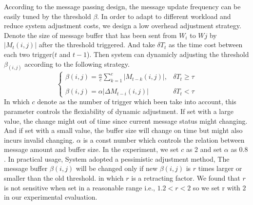 {	
	According to the message passing design, the message update frequency can be easily tuned by the threshold $\beta$.
	In order to adapt to different workload and reduce system adjustment costs, we design a low overhead adjustment strategy. Denote the size of message buffer that has been sent from $W_i$ to $Wj$ by $|M_t(i,j)|$ after the threshold triggered. And take $\delta T_t$ as the time cost between each two trigger($t$ and $t-1$). Then system can dynamicly adjusting the threshold $\beta_{(i,j)}$ according to the following strategy.
	\begin{equation}
\left\{         
\begin{array}{lr}            
 \beta(i,j)=\frac{\alpha}{c}\sum_{k=1}^{c}| M_{t-k}(i,j)|,&   \delta T_t  \ge \tau  \\
 &\\
\beta(i,j)=\alpha|\Delta M_{t-i}(i,j)|  & \delta T_t  < \tau
\end{array}
\right.
\end{equation}
	In which $c$ denote as the number of trigger which been take into account, this parameter controls the flexiability of dynamic adjustment. If set with a large value, the change might out of time since current message status might changing. And if set with a small value, the buffer size will change on time but might also incurs invalid changing. $\alpha$ is a const number which controls the relation between message amount and buffer size. In the experiment, we set $c$ as 2 and set $\alpha$ as $0.8$. In practical usage, System adopted a pessimistic adjustment method, The message buffer $\beta(i,j)$ will be changed only if new $\beta(i,j)$ is $r$ times larger or smaller than the old threshold. in which $r$ is a retracting factor. We found that $r$ is not sensitive when set in a reasonable range i.e., $1.2<r<2$ so we set r with $2$ in our experimental evaluation.
}
